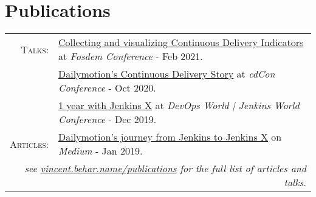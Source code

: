 \documentclass[a4paper,11pt]{article}
\begin{document}
\section{Publications}
\begin{tabular}{rl}
    \textsc{Talks:}&\href{https://vincent.behar.name/publications/2021-02-fosdem/}{Collecting and visualizing Continuous Delivery Indicators} at \textit{Fosdem Conference} - Feb 2021.\\
    &\href{https://vincent.behar.name/publications/2020-10-cdcon/}{Dailymotion's Continuous Delivery Story} at \textit{cdCon Conference} - Oct 2020.\\
    &\href{https://vincent.behar.name/publications/2019-12-dwjw-lisbon/}{1 year with Jenkins X} at \textit{DevOps World | Jenkins World Conference} - Dec 2019.\\
    \textsc{Articles:}&\href{https://vincent.behar.name/publications/2019-01-article-from-jenkins-to-jenkins-x/}{Dailymotion's journey from Jenkins to Jenkins X} on \textit{Medium} - Jan 2019.\\
  \multicolumn{2}{r}{\footnotesize\itshape see \href{https://vincent.behar.name/publications/}{vincent.behar.name/publications} for the full list of articles and talks.}\\
\end{tabular}
\end{document}
